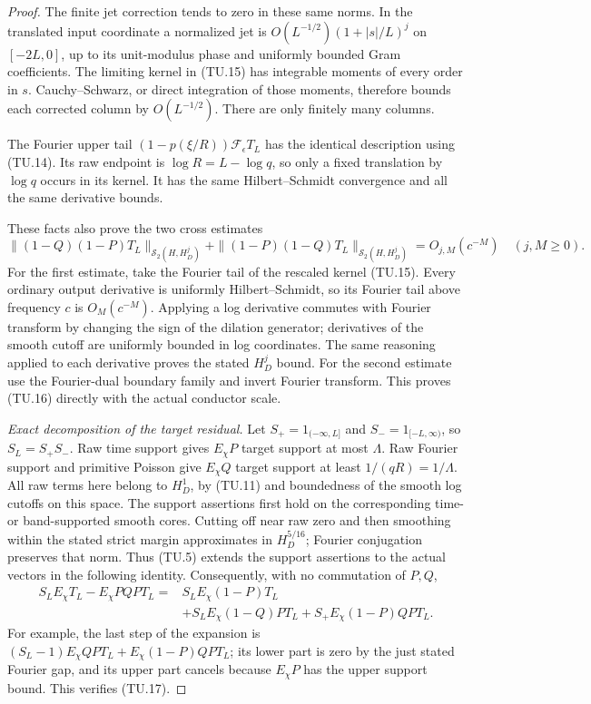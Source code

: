 \begin{proof}
The finite jet correction tends to zero in these same norms.
In the translated input coordinate a normalized jet is
\(O(L^{-1/2})(1+|s|/L)^j\) on \([-2L,0]\), up to its
unit-modulus phase and uniformly bounded Gram coefficients.
The limiting kernel in (TU.15) has integrable moments of
every order in \(s\).
Cauchy--Schwarz, or direct integration of those moments,
therefore bounds each corrected column by \(O(L^{-1/2})\).
There are only finitely many columns.

The Fourier upper tail
\((1-p(\xi/R))\mathcal F_\epsilon T_L\) has the identical
description using (TU.14).
Its raw endpoint is \(\log R=L-\log q\), so only a fixed
translation by \(\log q\) occurs in its kernel.
It has the same Hilbert--Schmidt convergence and all the
same derivative bounds.

These facts also prove the two cross estimates
\[
 \|(1-Q)(1-P)T_L\|_{\mathcal S_2(H,H_D^j)}
 +\|(1-P)(1-Q)T_L\|_{\mathcal S_2(H,H_D^j)}
                   =O_{j,M}(c^{-M})\quad(j,M\geq0).
 \tag{TU.16}
\]
For the first estimate, take the Fourier tail of the
rescaled kernel (TU.15).  Every ordinary output derivative
is uniformly Hilbert--Schmidt, so its Fourier tail above
frequency \(c\) is \(O_M(c^{-M})\).
Applying a log derivative commutes with Fourier transform
by changing the sign of the dilation generator; derivatives
of the smooth cutoff are uniformly bounded in log coordinates.
The same reasoning applied to each derivative proves the
stated \(H_D^j\) bound.
For the second estimate use the Fourier-dual boundary family
and invert Fourier transform.  This proves (TU.16) directly
with the actual conductor scale.

\emph{Exact decomposition of the target residual.}
Let \(S_+=1_{(-\infty,L]}\) and \(S_-=1_{[-L,\infty)}\),
so \(S_L=S_+S_-\).
Raw time support gives \(E_\chi P\) target support at most
\(\Lambda\).  Raw Fourier support and primitive Poisson
give \(E_\chi Q\) target support at least
\(1/(qR)=1/\Lambda\).
All raw terms here belong to \(H_D^1\), by (TU.11) and
boundedness of the smooth log cutoffs on this space.
The support assertions first hold on the corresponding
time- or band-supported smooth cores.  Cutting off near
raw zero and then smoothing within the stated strict margin
approximates in \(H_D^{5/16}\); Fourier conjugation preserves
that norm.  Thus (TU.5) extends the support assertions to
the actual vectors in the following identity.
Consequently, with no commutation of \(P,Q\),
\[
 \begin{split}
 S_LE_\chi T_L-E_\chi PQPT_L
  ={}&S_LE_\chi(1-P)T_L\\
    &+S_LE_\chi(1-Q)PT_L
      +S_+E_\chi(1-P)QPT_L .
 \end{split}
 \tag{TU.17}
\]
For example, the last step of the expansion is
\((S_L-1)E_\chi QPT_L+E_\chi(1-P)QPT_L\);
its lower part is zero by the just stated Fourier gap,
and its upper part cancels because \(E_\chi P\) has
the upper support bound.  This verifies (TU.17).


\end{proof}
